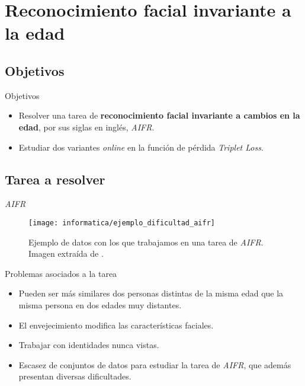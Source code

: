 \section{Reconocimiento facial invariante a la edad}

\subsection{Objetivos}
\begin{frame}{Objetivos}

	\begin{itemize}
		\item Resolver una tarea de \textbf{reconocimiento facial invariante a cambios en la edad}, por sus siglas en inglés, \textit{AIFR}.
		\item Estudiar dos variantes \textit{online} en la función de pérdida \textit{Triplet Loss}.
	\end{itemize}

\end{frame}

\subsection{Tarea a resolver}

\begin{frame}{\textit{AIFR}}

	\begin{figure}
		\texttt{[image: informatica/ejemplo\_dificultad\_aifr]}
		\caption{Ejemplo de datos con los que trabajamos en una tarea de \textit{AIFR}. Imagen extraída de \cite{informatica:aifr_survey}.}
		\label{img:ejemplo_dificultad_aifr}
	\end{figure}

\end{frame}

\begin{frame}{Problemas asociados a la tarea}

	\begin{itemize}
		\item Pueden ser más similares dos personas distintas de la misma edad que la misma persona en dos edades muy distantes.
		\item El envejecimiento modifica las características faciales.
		\item Trabajar con identidades nunca vistas.
		\item Escasez de conjuntos de datos para estudiar la tarea de \textit{AIFR}, que además presentan diversas dificultades.
	\end{itemize}

\end{frame}

